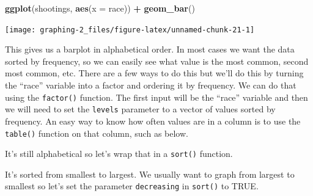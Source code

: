 \documentclass[
  12pt,
]{book}
\newenvironment{Shaded}{\begin{snugshade}}{\end{snugshade}}
\newcommand{\CommentTok}[1]{\textcolor[rgb]{0.56,0.35,0.01}{\textit{#1}}}
\newcommand{\DataTypeTok}[1]{\textcolor[rgb]{0.13,0.29,0.53}{#1}}
\newcommand{\KeywordTok}[1]{\textcolor[rgb]{0.13,0.29,0.53}{\textbf{#1}}}
\newcommand{\NormalTok}[1]{#1}
\newcommand{\OperatorTok}[1]{\textcolor[rgb]{0.81,0.36,0.00}{\textbf{#1}}}
\newcommand{\StringTok}[1]{\textcolor[rgb]{0.31,0.60,0.02}{#1}}
\begin{document}
\begin{Shaded}
\begin{Highlighting}[]
\KeywordTok{ggplot}\NormalTok{(shootings, }\KeywordTok{aes}\NormalTok{(}\DataTypeTok{x =}\NormalTok{ race)) }\OperatorTok{+}\StringTok{ }
\StringTok{  }\KeywordTok{geom\_bar}\NormalTok{()}
\end{Highlighting}
\end{Shaded}

\begin{center}\texttt{[image: graphing-2\_files/figure-latex/unnamed-chunk-21-1]} \end{center}

This gives us a barplot in alphabetical order. In most cases we want the data sorted by frequency, so we can easily see what value is the most common, second most common, etc. There are a few ways to do this but we'll do this by turning the ``race'' variable into a factor and ordering it by frequency. We can do that using the \texttt{factor()} function. The first input will be the ``race'' variable and then we will need to set the \texttt{levels} parameter to a vector of values sorted by frequency. An easy way to know how often values are in a column is to use the \texttt{table()} function on that column, such as below.

\begin{Shaded}
\end{Shaded}

It's still alphabetical so let's wrap that in a \texttt{sort()} function.

\begin{Shaded}
\end{Shaded}

It's sorted from smallest to largest. We usually want to graph from largest to smallest so let's set the parameter \texttt{decreasing} in \texttt{sort()} to TRUE.
\end{document}
